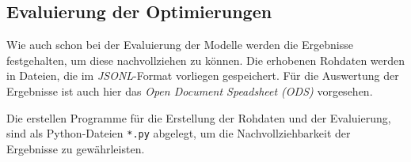 \subsection{Evaluierung der Optimierungen}
Wie auch schon bei der Evaluierung der Modelle werden die Ergebnisse festgehalten, um diese nachvollziehen zu können. Die erhobenen Rohdaten werden in Dateien, die im \textit{JSONL}-Format vorliegen gespeichert. Für die Auswertung der Ergebnisse ist auch hier das \textit{Open Document Speadsheet (ODS)} vorgesehen.\vspace{0.2cm}

Die erstellen Programme für die Erstellung der Rohdaten und der Evaluierung, sind als Python-Dateien \texttt{*.py} abgelegt, um die Nachvollziehbarkeit der Ergebnisse zu gewährleisten.





